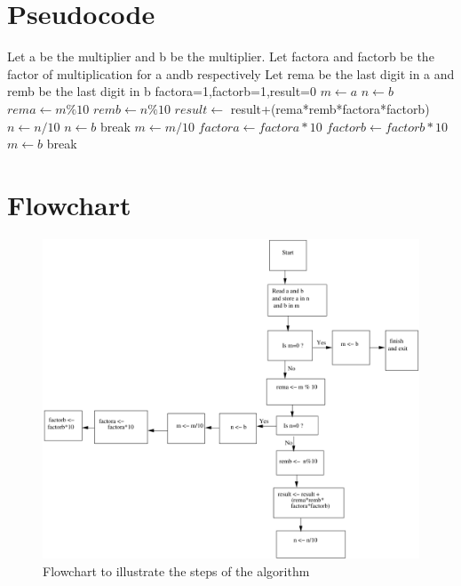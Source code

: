 \documentclass[10pt,a4paper]{article}
\begin{document}
\newpage

\vspace{4cm}
\section{Pseudocode}
\begin{algorithm}
\begin{algorithmic}
\large
\STATE Let a be the multiplier and b be the multiplier.
\STATE Let factora and factorb be the factor of multiplication for a andb respectively 
\STATE Let rema be the last digit in a and remb be the last digit in b
\STATE factora=1,factorb=1,result=0
\STATE $ m \leftarrow a$
\STATE $n \leftarrow b$
\STATE $rema \leftarrow m \% 10$
\STATE   $remb \leftarrow n\%10$
\STATE  $result \leftarrow$ result+(rema*remb*factora*factorb)
\STATE  $n \leftarrow n/10$
\STATE $n \leftarrow b$
\STATE break
\ENDIF
\ENDWHILE
\STATE $ m \leftarrow m/10 $
\STATE $factora \leftarrow factora*10$
\STATE $factorb \leftarrow factorb*10$
\STATE  $m \leftarrow b$
\STATE break
\ENDIF
\ENDWHILE
\end{algorithmic}
\end{algorithm}
\newpage

\newpage
\section{Flowchart}

\begin{figure}
\centering
\caption{ Flowchart to illustrate the steps of the algorithm}
\label{flow:flowchart}
\includegraphics{flowchart}
\end{figure}
\end{document}
